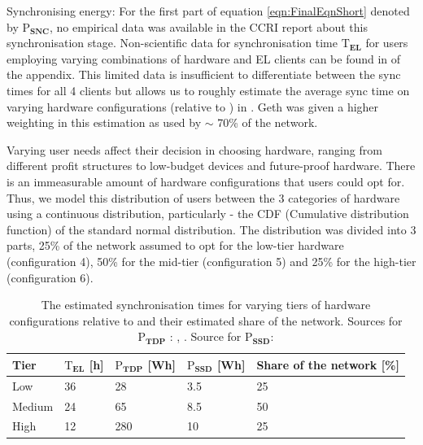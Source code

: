 Synchronising energy: 
For the first part of equation \ref{eqn:FinalEqnShort} denoted by $\boldsymbol{\mathrm{P}_{SNC}}$, no empirical data was available in the CCRI report about this synchronisation stage. Non-scientific data for synchronisation time $\boldsymbol{\mathrm{T}_{EL}}$ for users employing varying combinations of hardware and EL clients can be found in  of the appendix. This limited data is insufficient to differentiate between the sync times for all 4 clients but allows us to roughly estimate the average sync time on varying hardware configurations (relative to )  in . Geth was given a higher weighting in this estimation as used by  $\sim$ 70\% of the network. 

Varying user needs affect their decision in choosing hardware, ranging from different profit structures to low-budget devices and future-proof hardware. There is an immeasurable amount of hardware configurations that users could opt for. Thus, we model this distribution of users between the 3 categories of hardware using a continuous distribution, particularly - the CDF (Cumulative distribution function) of the standard normal distribution. The distribution was divided into 3 parts, 25\% of the network assumed to opt for the low-tier hardware (configuration 4), 50\% for the mid-tier (configuration 5) and 25\% for the high-tier (configuration 6). 

\begin{table}[h]
\centering
\begin{tabular}{|l|l|l|l|l|}
\hline
\textbf{Tier} & \textbf{$\boldsymbol{\mathrm{T}_{EL}}$ {[}h{]}} & \textbf{$\boldsymbol{\mathrm{P}_{TDP}}$ {[}Wh{]}} & \textbf{$\boldsymbol{\mathrm{P}_{SSD}}$ {[}Wh{]}} & \textbf{Share of the network {[}\%{]}} \\ \hline
Low    & 36 & 28  & 3.5 & 25 \\ \hline
Medium & 24 & 65  & 8.5 & 50 \\ \hline
High   & 12 & 280 & 10  & 25 \\ \hline
\end{tabular}
\caption{The estimated synchronisation times for varying tiers of hardware configurations relative to  and their estimated share of the network. Sources for $\boldsymbol{\mathrm{P}_{TDP}}$ : \cite{IntelFAQs}, \cite{AMDDatabase}. Source for $\boldsymbol{\mathrm{P}_{SSD}}$: \cite{RachanaKhamamkar2020AnalyzingDrives}}
\label{Table:SyncEnergy}
\end{table}

